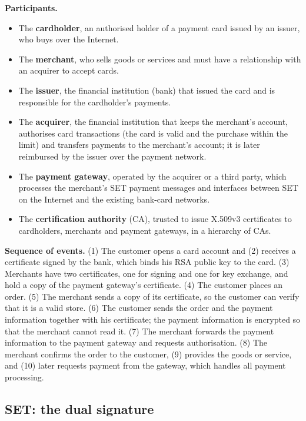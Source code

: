\textbf{Participants.}
\begin{itemize}
  \item The \textbf{cardholder}, an authorised holder of a payment card issued by an issuer, who buys over the Internet.
  \item The \textbf{merchant}, who sells goods or services and must have a relationship with an acquirer to accept cards.
  \item The \textbf{issuer}, the financial institution (bank) that issued the card and is responsible for the cardholder's payments.
  \item The \textbf{acquirer}, the financial institution that keeps the merchant's account, authorises card transactions (the card is valid and the purchase within the limit) and transfers payments to the merchant's account; it is later reimbursed by the issuer over the payment network.
  \item The \textbf{payment gateway}, operated by the acquirer or a third party, which processes the merchant's SET payment messages and interfaces between SET on the Internet and the existing bank-card networks.
  \item The \textbf{certification authority} (CA), trusted to issue X.509v3 certificates to cardholders, merchants and payment gateways, in a hierarchy of CAs.
\end{itemize}

\textbf{Sequence of events.} (1) The customer opens a card account and (2) receives a certificate signed by the bank, which binds his RSA public key to the card. (3) Merchants have two certificates, one for signing and one for key exchange, and hold a copy of the payment gateway's certificate. (4) The customer places an order. (5) The merchant sends a copy of its certificate, so the customer can verify that it is a valid store. (6) The customer sends the order and the payment information together with his certificate; the payment information is encrypted so that the merchant cannot read it. (7) The merchant forwards the payment information to the payment gateway and requests authorisation. (8) The merchant confirms the order to the customer, (9) provides the goods or service, and (10) later requests payment from the gateway, which handles all payment processing.

\subsection{SET: the dual signature \hot\new}

